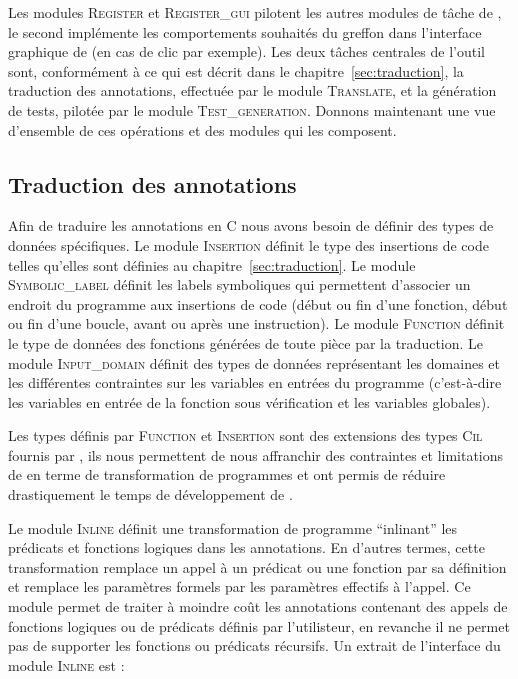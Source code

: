 Les modules \textsc{Register} et \textsc{Register\_gui} pilotent les autres
modules de tâche de \stady, le second implémente les comportements souhaités
du greffon dans l'interface graphique de \framac (en cas de clic par exemple).
Les deux tâches centrales de l'outil sont, conformément à ce qui est décrit dans
le chapitre~\ref{sec:traduction}, la traduction des annotations, effectuée
par le module \textsc{Translate}, et la génération de tests, pilotée par le
module \textsc{Test\_generation}.
Donnons maintenant une vue d'ensemble de ces opérations et des modules qui les
composent.


\subsection{Traduction des annotations}


Afin de traduire les annotations \eacsl en C nous avons besoin de définir des
types de données spécifiques.
Le module \textsc{Insertion} définit le type des insertions de code telles
qu'elles sont définies au chapitre~\ref{sec:traduction}.
Le module \textsc{Symbolic\_label} définit les labels symboliques qui permettent
d'associer un endroit du programme aux insertions de code (début ou fin d'une
fonction, début ou fin d'une boucle, avant ou après une instruction).
Le module \textsc{Function} définit le type de données des fonctions générées
de toute pièce par la traduction.
Le module \textsc{Input\_domain} définit des types de données représentant les
domaines et les différentes contraintes sur les variables en entrées du
programme (c'est-à-dire les variables en entrée de la fonction sous vérification
et les variables globales).

Les types définis par \textsc{Function} et \textsc{Insertion} sont des
extensions des types \textsc{Cil} fournis par \framac, ils nous permettent de
nous affranchir des contraintes et limitations de \framac en terme de
transformation de programmes et ont permis de réduire drastiquement le temps de
développement de \stady.

Le module \textsc{Inline} définit une transformation de programme ``inlinant''
les prédicats et fonctions logiques dans les annotations.
En d'autres termes, cette transformation remplace un appel à un prédicat ou une
fonction par sa définition et remplace les paramètres formels par les paramètres
effectifs à l'appel.
Ce module permet de traiter à moindre coût les annotations contenant des appels
de fonctions logiques ou de prédicats définis par l'utilisteur, en revanche il
ne permet pas de supporter les fonctions ou prédicats récursifs.
Un extrait de l'interface du module \textsc{Inline} est :

